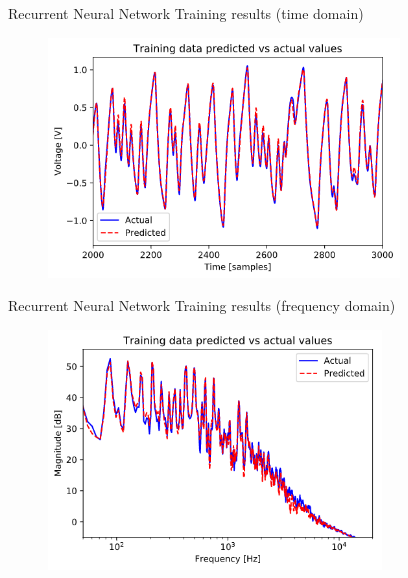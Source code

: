 \begin{frame}{Recurrent Neural Network}
    Training results (time domain)
    \begin{figure}
        \centering
        \includegraphics[height=2.5in]{../Paper/Figures/TimeDomain.png}
    \end{figure}
\end{frame}

\begin{frame}{Recurrent Neural Network}
    Training results (frequency domain)
    \begin{figure}
        \centering
        \includegraphics[height=2.5in]{../Paper/Figures/FreqDomain.png}
    \end{figure}
\end{frame}

\begin{frame}
\end{frame}

